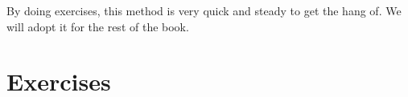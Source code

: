 
	By doing exercises, this method is very quick and steady to get the hang of. We will adopt it for the rest of the book.
	
	
	\section{Exercises} %
	\label{sec:exercises1}
	

% 